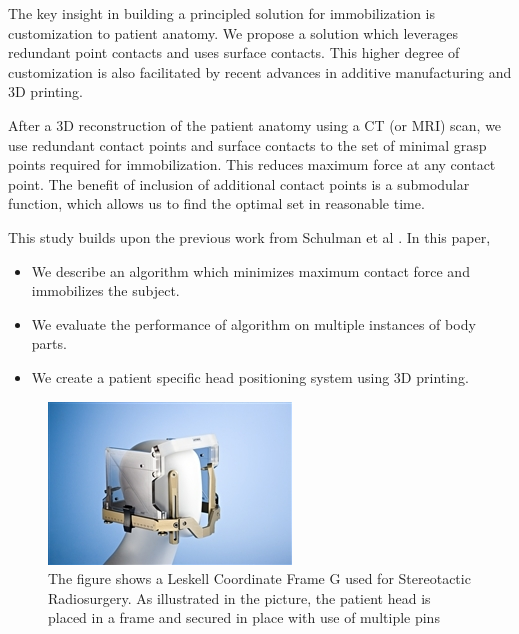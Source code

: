 The key insight in building a principled solution for immobilization is 
customization to patient anatomy. We propose a solution which leverages 
redundant point contacts  and uses surface contacts. 
This higher degree of customization is also facilitated by
recent advances in additive manufacturing and 3D printing.

After a 3D reconstruction of the patient anatomy using a CT (or MRI) scan,
we use redundant contact points and surface contacts to the set of minimal 
grasp points required for immobilization. This reduces maximum force at any
contact point. The benefit of inclusion of additional contact points is a 
submodular function, which allows us to find the optimal set in reasonable time. 

This study builds upon the previous work from Schulman et al 
\cite{schulman2011grasping}. In this paper,
\begin{itemize}
\item We describe an algorithm which minimizes maximum contact force and 
immobilizes the subject.
\item We evaluate the performance of algorithm on multiple instances of  
body parts.
\item We create a patient specific head positioning system using 3D printing.

\end{itemize}

\begin{figure}[t!]
  \begin{center}
    \includegraphics[width=0.8\linewidth]{images/leskellFrame}
  \end{center}
  \vspace{-10pt}
\caption{ The figure shows a Leskell Coordinate Frame G used for Stereotactic Radiosurgery.
As illustrated in the picture, the patient head is placed in a frame and secured in place with 
use of multiple pins}
  \vspace*{-15pt}
  \label{fig:leskellFrame}
\end{figure}
